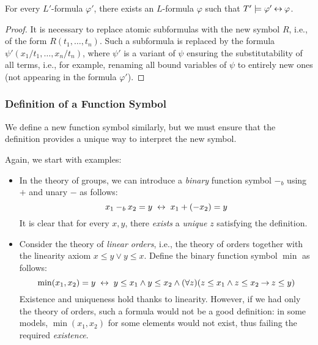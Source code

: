 \begin{proposition}
    For every $L'$-formula $\varphi'$, there exists an $L$-formula $\varphi$ such that $T'\models\varphi'\mathbin{\leftrightarrow}\varphi$.
\end{proposition}
\begin{proof}
    It is necessary to replace atomic subformulas with the new symbol $R$, i.e., of the form $R(t_1,\dots,t_n)$. Such a subformula is replaced by the formula $\psi'(x_1/t_1,\dots,x_n/t_n)$, where $\psi'$ is a variant of $\psi$ ensuring the substitutability of all terms, i.e., for example, renaming all bound variables of $\psi$ to entirely new ones (not appearing in the formula $\varphi'$).
\end{proof}

\subsubsection*{Definition of a Function Symbol}

We define a new function symbol similarly, but we must ensure that the definition provides a unique way to interpret the new symbol.

\begin{example}
    Again, we start with examples:
    \begin{itemize}
        \item In the theory of groups, we can introduce a \emph{binary} function symbol $-_b$ using $+$ and unary $-$ as follows:
        $$
        x_1 -_b x_2 = y\ \mathbin{\leftrightarrow}\ x_1 + (-x_2) = y
        $$
        It is clear that for every $x, y$, there \emph{exists} a \emph{unique} $z$ satisfying the definition.
        \item Consider the theory of \emph{linear orders}, i.e., the theory of orders together with the linearity axiom $x\leq y\lor y\leq x$. Define the binary function symbol $\min$ as follows:
        $$
        \min(x_1,x_2)=y\ \mathbin{\leftrightarrow}\ y\leq x_1\land y\leq x_2\land (\forall z)(z\leq x_1\land z\leq x_2\mathbin{\rightarrow} z\leq y)
        $$
        Existence and uniqueness hold thanks to linearity. However, if we had only the theory of orders, such a formula would not be a good definition: in some models, $\min(x_1,x_2)$ for some elements would not exist, thus failing the required \emph{existence}.
    \end{itemize}
\end{example}

